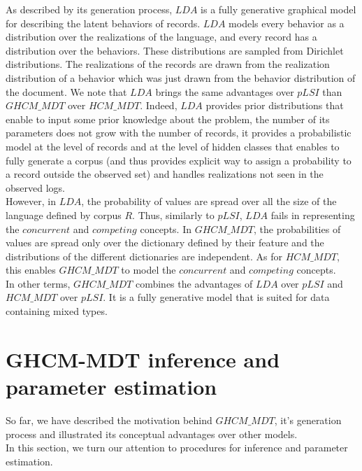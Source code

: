 As described by its generation process, $LDA$ is a fully generative graphical model for describing the latent behaviors of records. $LDA$ models every behavior as a distribution over the realizations of the language, and every record has a distribution over the behaviors. These distributions are sampled from Dirichlet distributions. The realizations of the records are drawn from the realization distribution of a behavior which was just drawn from the behavior distribution of the document. We note that $LDA$ brings the same advantages over $pLSI$ than $GHCM\_MDT$ over $HCM\_MDT$. Indeed, $LDA$ provides prior distributions that enable to input some prior knowledge about the problem, the number of its parameters does not grow with the number of records, it provides a probabilistic model at the level of records and at the level of hidden classes that enables to fully generate a corpus (and thus provides explicit way to assign a probability to a record outside the observed set) and handles realizations not seen in the observed logs.
\\However, in $LDA$, the probability of values are spread over all the size of the language defined by corpus $R$. Thus, similarly to $pLSI$, $LDA$ fails in representing the $concurrent$ and $competing$ concepts. In $GHCM\_MDT$, the probabilities of values are spread only over the dictionary defined by their feature and the distributions of the different dictionaries are independent. As for $HCM\_MDT$, this enables $GHCM\_MDT$ to model the $concurrent$ and $competing$ concepts.
\\In other terms, $GHCM\_MDT$ combines the advantages of $LDA$ over $pLSI$ and $HCM\_MDT$ over $pLSI$. It is a fully generative model that is suited for data containing mixed types.


\section{GHCM-MDT inference and parameter estimation}

So far, we have described the motivation behind $GHCM\_MDT$, it's generation process and illustrated its conceptual advantages over other models.
\\In this section, we turn our attention to procedures for inference and parameter estimation.

